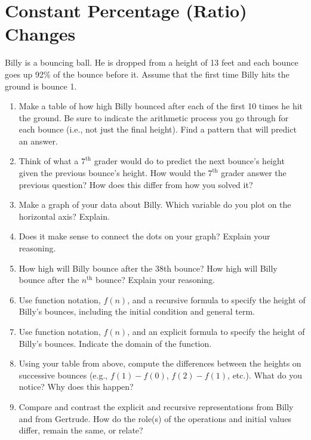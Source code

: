 \newpage
\section{Constant Percentage (Ratio) Changes}\label{A:ConstantRatio}

\begin{prob}
Billy is a bouncing ball.  He is dropped from a height of 13 feet and each bounce goes up 92\% of the bounce before it.  Assume that the first time Billy hits the ground is bounce 1.  

\begin{enumerate}
\item Make a table of how high Billy bounced after each of the first 10 times he hit the ground.  Be sure to indicate the arithmetic process you go through for each bounce (i.e., not just the final height).  Find a pattern that will predict an answer.  

\item Think of what a $7^\mathrm{th}$ grader would do to predict the next bounce's height given the previous bounce's height.  How would the $7^\mathrm{th}$ grader answer the previous question?  How does this differ from how you solved it?

\item Make a graph of your data about Billy.  Which variable do you plot on the horizontal axis?  Explain.  

\item Does it make sense to connect the dots on your graph?  Explain your reasoning.  

\item How high will Billy bounce after the 38th bounce?  How high will Billy bounce after the $n^\mathrm{th}$ bounce?  Explain your reasoning. 

\item  Use function notation, $f(n)$, and a recursive formula to specify the height of Billy's bounces, including the initial condition and general term.   

\item Use function notation, $f(n)$, and an explicit formula to specify the height of Billy's bounces.  Indicate the domain of the function.    

\item Using your table from above, compute the differences between the heights on successive bounces (e.g.,  $f(1) - f(0)$, $f(2) - f(1)$, etc.).  What do you notice?  Why does this happen?

\item Compare and contrast the explicit and recursive representations from Billy and from Gertrude.  How do the role(s) of the operations and initial values differ, remain the same, or relate?
\end{enumerate}
\end{prob}

